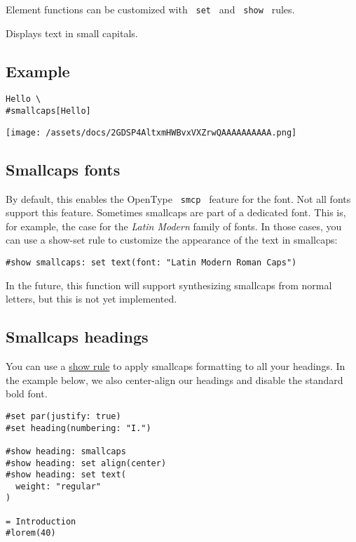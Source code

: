 \label{element-tooltip}
Element functions can be customized with \texttt{\ set\ } and
\texttt{\ show\ } rules.

Displays text in small capitals.

\subsection{Example}\label{example}

\begin{verbatim}
Hello \
#smallcaps[Hello]
\end{verbatim}

\texttt{[image: /assets/docs/2GDSP4AltxmHWBvxVXZrwQAAAAAAAAAA.png]}

\subsection{Smallcaps fonts}\label{smallcaps-fonts}

By default, this enables the OpenType \texttt{\ smcp\ } feature for the
font. Not all fonts support this feature. Sometimes smallcaps are part
of a dedicated font. This is, for example, the case for the \emph{Latin
Modern} family of fonts. In those cases, you can use a show-set rule to
customize the appearance of the text in smallcaps:

\begin{verbatim}
#show smallcaps: set text(font: "Latin Modern Roman Caps")
\end{verbatim}

In the future, this function will support synthesizing smallcaps from
normal letters, but this is not yet implemented.

\subsection{Smallcaps headings}\label{smallcaps-headings}

You can use a \href{/docs/reference/styling/\#show-rules}{show rule} to
apply smallcaps formatting to all your headings. In the example below,
we also center-align our headings and disable the standard bold font.

\begin{verbatim}
#set par(justify: true)
#set heading(numbering: "I.")

#show heading: smallcaps
#show heading: set align(center)
#show heading: set text(
  weight: "regular"
)

= Introduction
#lorem(40)
\end{verbatim}

